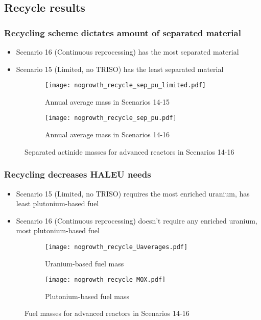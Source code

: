 \subsection{Recycle results}

\begin{frame}
    \frametitle{Recycling scheme dictates amount of separated material}
    \begin{itemize}
        \item Scenario 16 (Continuous reprocessing) has the 
              most separated material 
        \item Scenario 15 (Limited, no TRISO) has the least separated 
              material
    \end{itemize}
    \begin{figure}
        \centering
        \begin{subfigure}{0.48\textwidth}
            \texttt{[image: nogrowth\_recycle\_sep\_pu\_limited.pdf]}
            \caption{Annual average mass in Scenarios 14-15}
        \end{subfigure}
        \hfill
        \begin{subfigure}{0.48\textwidth}
            \texttt{[image: nogrowth\_recycle\_sep\_pu.pdf]}
            \caption{Annual average mass in Scenarios 14-16}
        \end{subfigure}
        \caption{Separated actinide masses for advanced reactors in Scenarios 14-16}
        \label{fig:recycle_sep_pu}
    \end{figure}
\end{frame}

\begin{frame}
    \frametitle{Recycling decreases HALEU needs}
    \begin{itemize}
        \item Scenario 15 (Limited, no TRISO) requires the most 
              enriched uranium, has least plutonium-based fuel
        \item Scenario 16 (Continuous reprocessing) doesn't 
              require any enriched uranium, most plutonium-based fuel
    \end{itemize}
    \begin{figure}
        \centering
        \begin{subfigure}{0.48\textwidth}
            \texttt{[image: nogrowth\_recycle\_Uaverages.pdf]}
            \caption{Uranium-based fuel mass}
        \end{subfigure}
        \hfill
        \begin{subfigure}{0.48\textwidth}
            \texttt{[image: nogrowth\_recycle\_MOX.pdf]}
            \caption{Plutonium-based fuel mass}
        \end{subfigure}
        \caption{Fuel masses for advanced reactors in Scenarios 14-16}
        \label{fig:recycle_fuel}
    \end{figure}
\end{frame}

